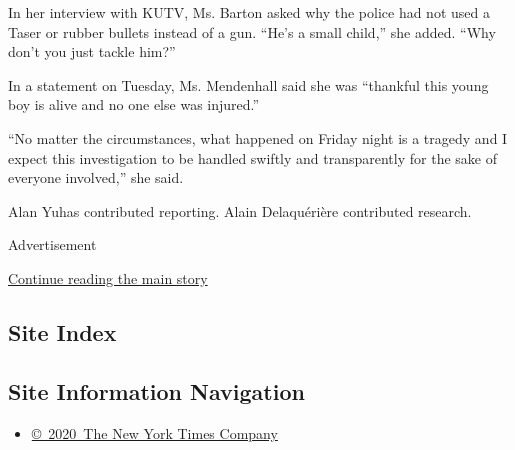 In her interview with KUTV, Ms. Barton asked why the police had not used
a Taser or rubber bullets instead of a gun. ``He's a small child,'' she
added. ``Why don't you just tackle him?''

In a statement on Tuesday, Ms. Mendenhall said she was ``thankful this
young boy is alive and no one else was injured.''

``No matter the circumstances, what happened on Friday night is a
tragedy and I expect this investigation to be handled swiftly and
transparently for the sake of everyone involved,'' she said.

Alan Yuhas contributed reporting. Alain Delaquérière contributed
research.

Advertisement

\protect\hyperlink{after-bottom}{Continue reading the main story}

\hypertarget{site-index}{%
\subsection{Site Index}\label{site-index}}

\hypertarget{site-information-navigation}{%
\subsection{Site Information
Navigation}\label{site-information-navigation}}

\begin{itemize}
\tightlist
\item
  \href{https://help.nytimes3xbfgragh.onion/hc/en-us/articles/115014792127-Copyright-notice}{©~2020~The
  New York Times Company}
\end{itemize}

